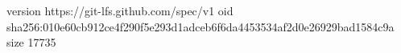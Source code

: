 version https://git-lfs.github.com/spec/v1
oid sha256:010e60cb912ce4f290f5e293d1adceb6f6da4453534af2d0e26929bad1584c9a
size 17735
